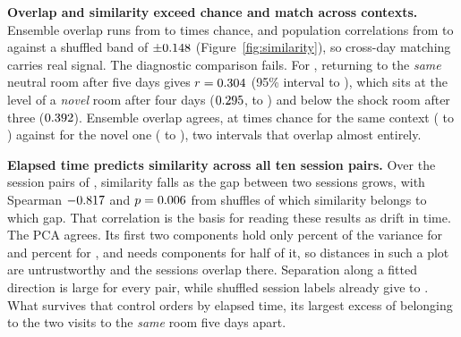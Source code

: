 \documentclass[11pt,a4paper]{article}
\begin{document}
\textbf{Overlap and similarity exceed chance and match across contexts.} Ensemble
overlap runs from \numOverlapRatioMin{} to \numOverlapRatioMax{} times chance, and population
correlations from \numSimilarityPearsonMin{} to \numSimilarityPearsonMax{} against a shuffled
band of $\pm0.148{}$ (Figure~\ref{fig:similarity}), so cross-day matching
carries real signal. The diagnostic comparison fails. For \numDatasetWeakShockMouse{},
returning to the \emph{same} neutral room after five days gives
$r=0.304{}$ (95\% interval
\numSimilaritySameContextFiveDaysPearsonCiLow{} to
\numSimilaritySameContextFiveDaysPearsonCiHigh{}), which sits at the level of a \emph{novel}
room after four days ($0.295{}$,
\numSimilarityNovelContextFourDaysPearsonCiLow{} to
\numSimilarityNovelContextFourDaysPearsonCiHigh{}) and below the shock room after three
($0.392{}$). Ensemble overlap agrees, at
\numOverlapSameContextFiveDaysRatioToChance{} times chance for the same context
(\numOverlapSameContextFiveDaysRatioCiLow{} to \numOverlapSameContextFiveDaysRatioCiHigh{})
against \numOverlapNovelContextFourDaysRatioToChance{} for the novel one
(\numOverlapNovelContextFourDaysRatioCiLow{} to \numOverlapNovelContextFourDaysRatioCiHigh{}),
two intervals that overlap almost entirely.

\textbf{Elapsed time predicts similarity across all ten session pairs.} Over the
\numSimilarityDriftPairs{} session pairs of \numDatasetWeakShockMouse{}, similarity falls as
the gap between two sessions grows, with Spearman $-0.817{}$ and
$p=0.006{}$ from \numSimilarityDriftShuffles{} shuffles of which
similarity belongs to which gap. That correlation is the basis for reading these results as
drift in time. The PCA agrees. Its first two components hold only
\numPcaVarianceFirstTwoWeakPercent{} percent of the variance for \numDatasetWeakShockMouse{}
and \numPcaVarianceFirstTwoStrongPercent{} percent for \numDatasetStrongShockMouse{}, and
\numDatasetWeakShockMouse{} needs \numPcaComponentsForHalfWeak{} components for half of it, so
distances in such a plot are untrustworthy and the sessions overlap there. Separation along a fitted
direction is large for every pair, while shuffled session labels already give
\numPcaSeparationShuffledMin{} to \numPcaSeparationShuffledMax{}. What survives that control
orders by elapsed time, its largest excess of \numPcaSameContextExcess{} belonging to the two
visits to the \emph{same} room five days apart.
\end{document}
